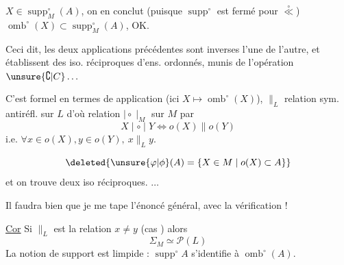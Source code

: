 
$X\in\operatorname{supp}^{\circ}_M(A)$, on en conclut (puisque $\operatorname{supp}^{\circ}$ est fermé pour $\overset{\circ}{\ll}$) $\operatorname{omb}^{\circ}(X)\subset\operatorname{supp}^{\circ}_M(A)$, OK.

Ceci dit, les deux applications précédentes sont inverses l'une de l'autre, et établissent des iso. réciproques d'ens. ordonnés, munis de l'opération $\unsure{\complement|C}\ldots$

C'est formel en termes de
application (ici $X\mapsto\operatorname{omb}^{\circ}(X)$), $\mathrel{\|}_L$ relation sym. antiréfl. sur $L$ d'où relation $\mid\circ\mid_M$ sur $M$ par
\[
 X\mid\circ\mid Y\Longleftrightarrow o(X)\mathrel{\|}o(Y)
\]
i.e. $\forall x\in o(X),y\in o(Y),\ x\mathrel{\|}_L y$.

\[
\deleted{\unsure{\varphi|\phi}(A)=\{X\in M\mid o(X)\subset A\}}
\]
et on trouve  deux iso  réciproques.
\hfill $\ldots$

Il faudra bien que je me tape l'énoncé général, avec la vérification !

\uline{Cor} Si $\mathrel{\|}_L$ est la relation $x\ne y$ (cas ) alors
\[
\Sigma_M\simeq\mathcal{P}(L)
\]
La notion de support est limpide : $\operatorname{supp}^{\circ}A$ s'identifie à $\operatorname{omb}^{\circ}(A)$.
